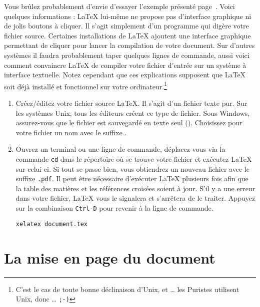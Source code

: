 Vous brûlez probablement d'envie d'essayer l'exemple présenté
page~\pageref{mini}. Voici quelques informations : \LaTeX{} lui-même
ne propose pas d'interface graphique ni de jolis boutons à cliquer. Il
s'agit simplement d'un programme qui \og digère \fg{} votre fichier
source. Certaines installations de \LaTeX{} ajoutent une interface
graphique permettant de cliquer pour lancer la \og compilation \fg{} de votre
document. Sur d'autres systèmes il faudra probablement taper quelques
lignes de commande, aussi voici comment convaincre \LaTeX{} de
compiler votre fichier d'entrée sur un système à interface
textuelle. Notez cependant que ces explications supposent que \LaTeX{}
soit déjà installé et fonctionnel sur votre ordinateur.\footnote{
C'est le cas de toute bonne déclinaison d'Unix, et \ldots{} les
Puristes utilisent Unix, donc \ldots{} \texttt{;-)}}

\begin{enumerate}
\item Créez/éditez votre fichier source \LaTeX{}. Il s'agit d'un
      fichier texte pur. Sur les systèmes Unix, tous les éditeurs
      créent ce type de fichier. Sous Windows, assurez-vous que le
      fichier est sauvegardé en texte seul (). Choisissez pour
      votre fichier un nom avec le suffixe .

\item


Ouvrez un terminal ou une ligne de commande, déplacez-vous via la
commande \texttt{cd} dans le répertoire où se trouve votre fichier et
exécutez \LaTeX{} sur celui-ci. Si tout se passe bien, vous
obtiendrez un nouveau fichier avec le suffixe \texttt{.pdf}. Il peut
être nécessaire d'exécuter \LaTeX{} plusieurs fois afin que la table
des matières et les références croisées soient à jour. S'il y a une
erreur dans votre fichier, \LaTeX{} vous le signalera et s'arrêtera de le traiter.
Appuyez sur la combinaison \texttt{Ctrl-D} pour revenir à la ligne de
commande.
\begin{lscommand}
\verb+xelatex document.tex+
\end{lscommand}

\end{enumerate}

\section{La mise en page du document}

